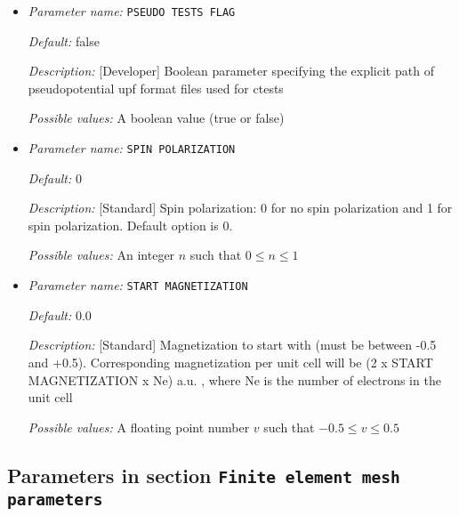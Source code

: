 \begin{itemize}
{\it Possible values:} Any string
\item {\it Parameter name:} {\tt PSEUDO TESTS FLAG}
\label{parameters:DFT functional parameters/PSEUDO TESTS FLAG}
\label{parameters:DFT_20functional_20parameters/PSEUDO_20TESTS_20FLAG}




{\it Default:} false


{\it Description:} [Developer] Boolean parameter specifying the explicit path of pseudopotential upf format files used for ctests


{\it Possible values:} A boolean value (true or false)
\item {\it Parameter name:} {\tt SPIN POLARIZATION}
\label{parameters:DFT functional parameters/SPIN POLARIZATION}
\label{parameters:DFT_20functional_20parameters/SPIN_20POLARIZATION}




{\it Default:} 0


{\it Description:} [Standard] Spin polarization: 0 for no spin polarization and 1 for spin polarization. Default option is 0.


{\it Possible values:} An integer $n$ such that $0\leq n \leq 1$
\item {\it Parameter name:} {\tt START MAGNETIZATION}
\label{parameters:DFT functional parameters/START MAGNETIZATION}
\label{parameters:DFT_20functional_20parameters/START_20MAGNETIZATION}




{\it Default:} 0.0


{\it Description:} [Standard] Magnetization to start with (must be between -0.5 and +0.5). Corresponding magnetization per unit cell will be (2 x START MAGNETIZATION x Ne) a.u. , where Ne is the number of electrons in the unit cell 


{\it Possible values:} A floating point number $v$ such that $-0.5 \leq v \leq 0.5$
\end{itemize}

\subsection{Parameters in section \tt Finite element mesh parameters}
\label{parameters:Finite_20element_20mesh_20parameters}

